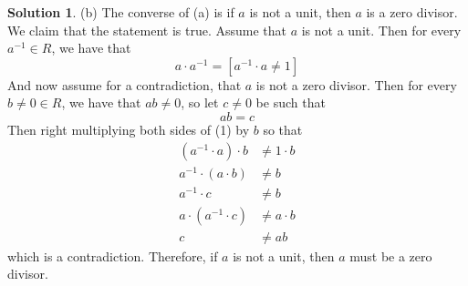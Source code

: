\documentclass[11pt]{amsart}
\theoremstyle{}\newtheorem{question}{Question}
\theoremstyle{}\newtheorem*{bonus}{Bonus}
\theoremstyle{definition}\newtheorem*{solution}{Solution}
\begin{document}
\begin{solution}
    (b) The converse of (a) is if $a$ is not a unit, then $a$ is a zero divisor. We claim that the statement is true. Assume that $a$ is not a unit. Then for every $a^{-1} \in R$, we have that
    \begin{equation*}
        a \cdot a^{-1} = [a^{-1} \cdot a \neq 1] \tag{1}
    \end{equation*}
    And now assume for a contradiction, that $a$ is not a zero divisor. Then for every $b \neq 0 \in R$, we have that $ab \neq 0$, so let $c \neq 0$ be such that
    \begin{equation*}
        ab = c \tag{2}
    \end{equation*}
    Then right multiplying both sides of (1) by $b$ so that
    \begin{align*}
        (a^{-1} \cdot a) \cdot b &\neq 1 \cdot b \\
        a^{-1} \cdot (a \cdot b) &\neq b \\
        a^{-1} \cdot c &\neq b \\
        a \cdot (a^{-1} \cdot c) &\neq a \cdot b \\
        c &\neq ab
    \end{align*}
    which is a contradiction. Therefore, if $a$ is not a unit, then $a$ must be a zero divisor.
\end{solution}
\end{document}
